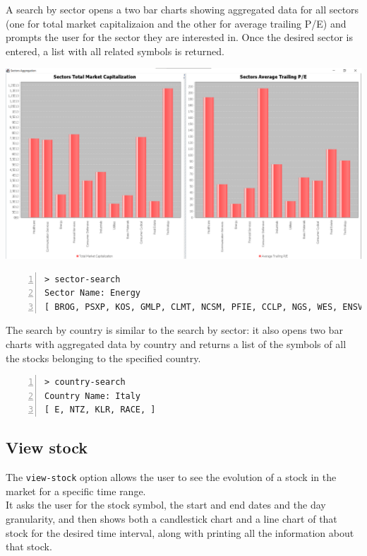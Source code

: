 A search by sector opens a two bar charts showing aggregated data for all sectors (one for total market capitalizaion and the other for average trailing P/E) and prompts the user for the sector they are interested in.
Once the desired sector is entered, a list with all related symbols is returned.

\hfill \break
{\centering
\includegraphics[scale=0.28]{img/user_manual/sector_aggregation.png}\\
}

\begin{lstlisting}[basicstyle=\footnotesize\ttfamily,language={},numbers=left,keepspaces=true,tabsize=4,
numberstyle=\footnotesize,numbersep=8pt,frame=single]
> sector-search
Sector Name: Energy
[ BROG, PSXP, KOS, GMLP, CLMT, NCSM, PFIE, CCLP, NGS, WES, ENSV, FTSI, AXAS, EC, DEN, TTI, NBLX, E, GTE, PSX, PED, NNA, VVV, PVL, AR, HP, CEQP, MUR, DK, RTLR, LEU, NGL, NFG, PTEN, MMLP, PAGP, NESR, NR, PBFX, TRMD, BKR, NOG, ... ]
\end{lstlisting}

The search by country is similar to the search by sector: it also opens two bar charts with aggregated data by country and returns a list of the symbols of all the stocks belonging to the specified country.
\begin{lstlisting}[basicstyle=\footnotesize\ttfamily,language={},numbers=left,keepspaces=true,tabsize=4,
numberstyle=\footnotesize,numbersep=8pt,frame=single]
> country-search
Country Name: Italy
[ E, NTZ, KLR, RACE, ]
\end{lstlisting}
\subsection{View stock}

The \texttt{view-stock} option allows the user to see the evolution of a stock in the market for a specific time range.\\
It asks the user for the stock symbol, the start and end dates and the day granularity, and then shows both a candlestick chart and a line chart of that stock for the desired time interval, along with printing all the information about that stock.

